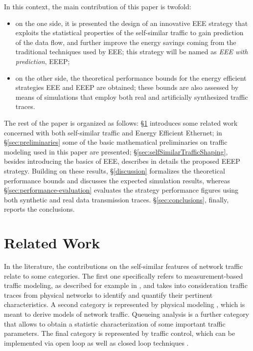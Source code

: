 \documentclass[journal,10pt,twoside,final]{IEEEtran}
\begin{document}
In this context, the main contribution of this paper is twofold:
\begin{itemize}
\item on the one side, it is presented the design of an innovative EEE strategy that exploits the statistical properties of the self-similar traffic to gain prediction of the data flow, and further improve the energy savings coming from the traditional techniques used by EEE; this strategy will be named as \emph{EEE with prediction}, EEEP;
\item on the other side, the theoretical performance bounds for the energy efficient strategies EEE and EEEP are obtained; these bounds are also assessed by means of simulations that employ both real and artificially synthesized traffic traces.
\end{itemize}

The rest of the paper is organized as follows: \S\ref{sec:relatedWork} introduces some related work concerned with both self-similar traffic and Energy Efficient Ethernet; in \S\ref{sec:preliminaries} some of the basic mathematical preliminaries on traffic modeling used in this paper are presented; \S\ref{sec:selfSimilarTrafficShaping}, besides introducing the basics of EEE, describes in details the proposed EEEP strategy. Building on these results, \S\ref{discussion} formalizes the theoretical performance bounds and discusses the expected simulation results, whereas \S\ref{sec:performance-evaluation} evaluates the strategy performance figures using both synthetic and real data transmission traces. \S\ref{sec:conclusions}, finally, reports the conclusions.


\section{Related Work}
\label{sec:relatedWork}

In the literature, the contributions on the self-similar features of network traffic relate to some categories. The first one specifically refers to measurement-based traffic modeling, as described for example in \cite{CrovellaBestavros97}, and takes into  consideration traffic traces from physical networks to identify and quantify their pertinent characteristics. A second category is represented by physical modeling \cite{WillingerTaqquSherman97}, which is meant to derive models of network traffic. Queueing analysis \cite{DuffieldOconnell95} is a further category that allows to obtain a statistic characterization of some important traffic parameters. The final category is represented by traffic control, which can be implemented via open loop as well as closed loop techniques \cite{TuanPark99}.
\end{document}
